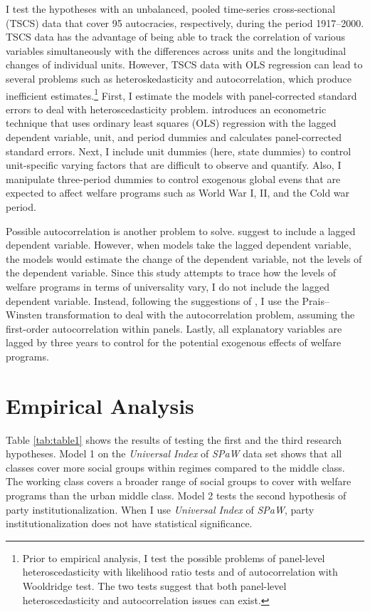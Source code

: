 \documentclass[11pt, notitlepage]{article}
\begin{document}
I test the hypotheses with an unbalanced, pooled time-series cross-sectional (TSCS) data that cover 95 autocracies, respectively, during the period 1917–2000. TSCS data has the advantage of being able to track the correlation of various variables simultaneously with the differences across units and the longitudinal changes of individual units. However, TSCS data with OLS regression can lead to several problems such as heteroskedasticity and autocorrelation, which produce inefficient estimates.\footnote{Prior to empirical analysis, I test the possible problems of panel-level heteroscedasticity with likelihood ratio tests and of autocorrelation with Wooldridge test. The two tests suggest that both panel-level heteroscedasticity and autocorrelation issues can exist.} First, I estimate the models with panel-corrected standard errors to deal with heteroscedasticity problem. \citet{Beck1995} introduces an econometric technique that uses ordinary least squares (OLS) regression with the lagged dependent variable, unit, and period dummies and calculates panel-corrected standard errors. Next, I include unit dummies (here, state dummies) to control unit-specific varying factors that are difficult to observe and quantify. Also, I manipulate three-period dummies to control exogenous global evens that are expected to affect welfare programs such as World War I, II, and the Cold war period.

Possible autocorrelation is another problem to solve. \citet{Beck1995} suggest to include a lagged dependent variable. However, when models take the lagged dependent variable, the models would estimate the change of the dependent variable, not the levels of the dependent variable. Since this study attempts to trace how the levels of welfare programs in terms of universality vary, I do not include the lagged dependent variable. Instead, following the suggestions of \citet{Plumper2005}, I use the Prais–Winsten transformation to deal with the autocorrelation problem, assuming the first-order autocorrelation within panels. Lastly, all explanatory variables are lagged by three years to control for the potential exogenous effects of welfare programs.

\section{Empirical Analysis}
Table \ref{tab:table1} shows the results of testing the first and the third research hypotheses. Model 1 on the \textit{Universal Index} of \textit{SPaW} data set shows that all classes cover more social groups within regimes compared to the middle class. The working class covers a broader range of social groups to cover with welfare programs than the urban middle class. Model 2 tests the second hypothesis of party institutionalization. When I use \textit{Universal Index} of \textit{SPaW}, party institutionalization does not have statistical significance. 
\end{document}
